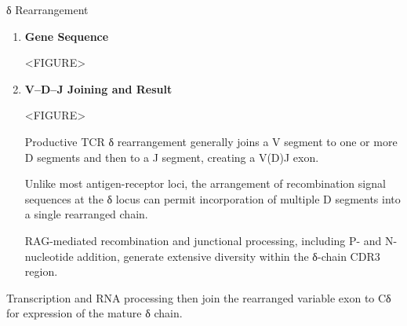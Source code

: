       \begin{core}{δ Rearrangement}

        \begin{enumerate}[label=(\arabic*)]

          \item \textbf{Gene Sequence}

            <FIGURE>

          \item \textbf{V--D--J Joining and Result}

            <FIGURE>

            Productive TCR δ rearrangement generally joins a V segment to one or more D segments and then to a J segment, creating a V(D)J exon.

            Unlike most antigen-receptor loci, the arrangement of recombination signal sequences at the δ locus can permit incorporation of multiple D segments into a single rearranged chain.

            RAG-mediated recombination and junctional processing, including P- and N-nucleotide addition, generate extensive diversity within the δ-chain CDR3 region.

        \end{enumerate}

        Transcription and RNA processing then join the rearranged variable exon to Cδ for expression of the mature δ chain.

      \end{core}

